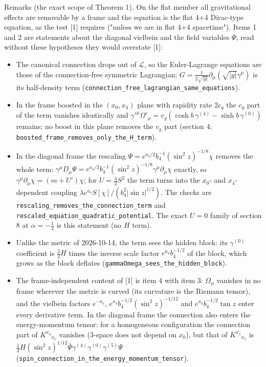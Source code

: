 \documentclass[11pt]{article}
\begin{document}
Remarks (the exact scope of Theorem 1). On the flat member all gravitational effects are removable by a frame and the equation is the flat 4+4 Dirac-type equation, as the test [1] requires ("unless we are in flat 4+4 spacetime"). Items 1 and 2 are statements about the diagonal vielbein and the field variables $\Psi$; read without these hypotheses they would overstate [1]:

\begin{itemize}
\item The canonical connection drops out of $\mathcal{L}$, so the Euler-Lagrange equations are those of the connection-free symmetric Lagrangian; $G = \frac{1}{2\sqrt{|g|}}\partial_\mu(\sqrt{|g|}\gamma^\mu)$ is its half-density term (\texttt{connecti\allowbreak{}on\_free\_\allowbreak{}lagrangi\allowbreak{}an\_same\_\allowbreak{}equation\allowbreak{}s}).
\item In the frame boosted in the $(x_0, x_4)$ plane with rapidity rate $2c_g$ the $c_g$ part of the term vanishes identically and $\gamma'^\mu\Omega'_\mu = v_g(\cosh b\,\gamma^{(4)} - \sinh b\,\gamma^{(0)})$ remains; no boost in this plane removes the $v_g$ part (section 4; \texttt{boosted\_\allowbreak{}frame\_re\allowbreak{}moves\_on\allowbreak{}ly\_the\_H\allowbreak{}\_term}).
\item In the diagonal frame the rescaling $\Psi = e^{a_4/2}b_4^{-1}(\sin^2 z)^{-1/8}\chi$ removes the whole term: $\gamma^\mu D_\mu\Psi = e^{a_4/2}b_4^{-1}(\sin^2 z)^{-1/8}\gamma^\mu\partial_\mu\chi$ exactly, so $\gamma^\mu\partial_\mu\chi = (m + U')\chi$; for $U = \frac{\lambda}{2}S^2$ the term turns into the $x_0$- and $x_4$-dependent coupling $\lambda e^{a_4}S[\chi]/(b_4^2|\sin z|^{1/2})$. The checks are \texttt{rescalin\allowbreak{}g\_remove\allowbreak{}s\_the\_co\allowbreak{}nnection\allowbreak{}\_term} and \texttt{rescaled\allowbreak{}\_equatio\allowbreak{}n\_quadra\allowbreak{}tic\_pote\allowbreak{}ntial}. The exact $U = 0$ family of section 8 at $\alpha = -\frac14$ is this statement (no $H$ term).
\item Unlike the metric of 2026-10-14, the term sees the hidden block: its $\gamma^{(0)}$ coefficient is $\tfrac32H$ times the inverse scale factor $e^{a_4}b_4^{-1/2}$ of the block, which grows as the block deflates (\texttt{gammaOme\allowbreak{}ga\_sees\_\allowbreak{}the\_hidd\allowbreak{}en\_block}).
\item The frame-independent content of [1] is item 4 with item 3: $\Omega_\mu$ vanishes in no frame wherever the metric is curved (its curvature is the Riemann tensor), and the vielbein factors $e^{-a_4}$, $e^{a_4}b_4^{-1/2}(\sin^2 z)^{-1/12}$ and $e^{a_4}b_4^{-1/2}\tan z$ enter every derivative term. In the diagonal frame the connection also enters the energy-momentum tensor: for a homogeneous configuration the connection part of $K^{x_4}{}_{x_1}$ vanishes (3-space does not depend on $x_0$), but that of $K^{x_4}{}_{x_5}$ is $\tfrac12H(\sin^2 z)^{1/12}\bar\Psi\gamma^{(4)}\gamma^{(0)}\gamma^{(5)}\Psi$ (\texttt{spin\_con\allowbreak{}nection\_\allowbreak{}in\_the\_e\allowbreak{}nergy\_mo\allowbreak{}mentum\_t\allowbreak{}ensor}).

\end{itemize}
\end{document}
